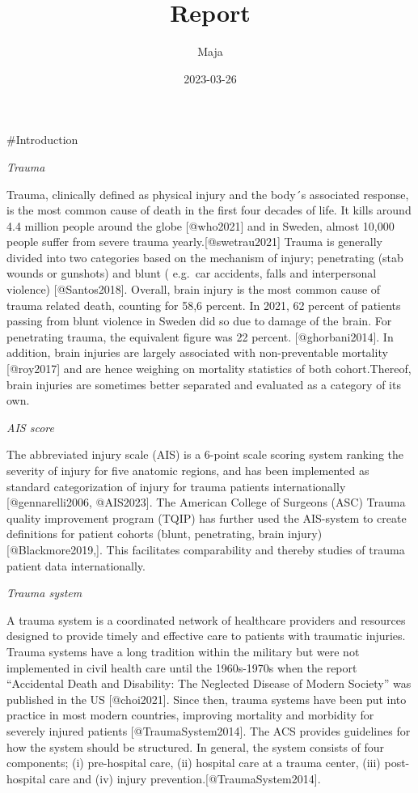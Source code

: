 \documentclass[
]{article}
\title{Report}
\author{Maja}
\date{2023-03-26}
\begin{document}
\maketitle

\#Introduction

\emph{Trauma}

Trauma, clinically defined as physical injury and the body´s associated
response, is the most common cause of death in the first four decades of
life. It kills around 4.4 million people around the globe {[}@who2021{]}
and in Sweden, almost 10,000 people suffer from severe trauma
yearly.{[}@swetrau2021{]} Trauma is generally divided into two
categories based on the mechanism of injury; penetrating (stab wounds or
gunshots) and blunt ( e.g.~car accidents, falls and interpersonal
violence) {[}@Santos2018{]}. Overall, brain injury is the most common
cause of trauma related death, counting for 58,6 percent. In 2021, 62
percent of patients passing from blunt violence in Sweden did so due to
damage of the brain. For penetrating trauma, the equivalent figure was
22 percent. {[}@ghorbani2014{]}. In addition, brain injuries are largely
associated with non-preventable mortality {[}@roy2017{]} and are hence
weighing on mortality statistics of both cohort.Thereof, brain injuries
are sometimes better separated and evaluated as a category of its own.

\emph{AIS score}

The abbreviated injury scale (AIS) is a 6-point scale scoring system
ranking the severity of injury for five anatomic regions, and has been
implemented as standard categorization of injury for trauma patients
internationally {[}@gennarelli2006, @AIS2023{]}. The American College of
Surgeons (ASC) Trauma quality improvement program (TQIP) has further
used the AIS-system to create definitions for patient cohorts (blunt,
penetrating, brain injury){[}@Blackmore2019,{]}. This facilitates
comparability and thereby studies of trauma patient data
internationally.

\emph{Trauma system}

A trauma system is a coordinated network of healthcare providers and
resources designed to provide timely and effective care to patients with
traumatic injuries. Trauma systems have a long tradition within the
military but were not implemented in civil health care until the
1960s-1970s when the report ``Accidental Death and Disability: The
Neglected Disease of Modern Society'' was published in the US
{[}@choi2021{]}. Since then, trauma systems have been put into practice
in most modern countries, improving mortality and morbidity for severely
injured patients {[}@TraumaSystem2014{]}. The ACS provides guidelines
for how the system should be structured. In general, the system consists
of four components; (i) pre-hospital care, (ii) hospital care at a
trauma center, (iii) post-hospital care and (iv) injury
prevention.{[}@TraumaSystem2014{]}.
\end{document}
